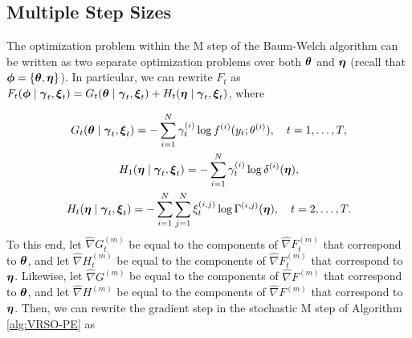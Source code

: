 



\subsection{Multiple Step Sizes}

The optimization problem within the M step of the Baum-Welch algorithm can be written as two separate optimization problems over both $\boldsymbol{\theta}$ and $\boldsymbol{\eta}$ (recall that $\boldsymbol{\phi} = \{\boldsymbol{\theta},\boldsymbol{\eta}\}$). In particular, we can rewrite $F_t$ as $F_t(\boldsymbol{\phi} \mid \boldsymbol{\gamma}_t,  \boldsymbol{\xi}_t) = G_t(\boldsymbol{\theta} \mid  \boldsymbol{\gamma}_t,  \boldsymbol{\xi}_t) + H_t(\boldsymbol{\eta} \mid  \boldsymbol{\gamma}_t,  \boldsymbol{\xi}_t)$, where

\begin{gather}
    G_t(\boldsymbol{\theta} \mid  \boldsymbol{\gamma}_t,  \boldsymbol{\xi}_t) = - \sum_{i=1}^N  \gamma^{(i)}_t \log f^{(i)}(y_t;\theta^{(i)}), \quad t = 1,\ldots,T, \\
    H_1(\boldsymbol{\eta} \mid  \boldsymbol{\gamma}_t,  \boldsymbol{\xi}_t) = - \sum_{i=1}^N  \gamma^{(i)}_t \log \delta^{(i)}(\boldsymbol{\eta}), \\
    H_t(\boldsymbol{\eta} \mid  \boldsymbol{\gamma}_t,  \boldsymbol{\xi}_t) =  - \sum_{i=1}^N \sum_{j=1}^N  \xi^{(i,j)}_t \log \Gamma^{(i,j)}(\boldsymbol{\eta}), \quad t = 2,\ldots,T.
\end{gather}
%
To this end, let $\widehat \nabla G^{(m)}_{t}$ be equal to the components of $\widehat \nabla F^{(m)}_{t}$ that correspond to $\boldsymbol{\theta}$, and let $\widehat \nabla H^{(m)}_{t}$ be equal to the components of $\widehat \nabla F^{(m)}_{t}$ that correspond to $\boldsymbol{\eta}$. Likewise, let $\widehat \nabla G^{(m)}$ be equal to the components of $\widehat \nabla F^{(m)}$ that correspond to $\boldsymbol{\theta}$, and let $\widehat \nabla H^{(m)}$ be equal to the components of $\widehat \nabla F^{(m)}$ that correspond to $\boldsymbol{\eta}$. Then, we can rewrite the gradient step in the stochastic M step of Algorithm \ref{alg:VRSO-PE} as

